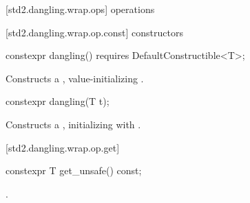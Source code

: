 [std2.dangling.wrap.ops]{ operations}

[std2.dangling.wrap.op.const]{ constructors}

%
\begin{itemdecl}
constexpr dangling() requires DefaultConstructible<T>;
\end{itemdecl}

\begin{itemdescr}
\pnum
\effects Constructs a , value-initializing .
\end{itemdescr}

%
\begin{itemdecl}
constexpr dangling(T t);
\end{itemdecl}

\begin{itemdescr}
\pnum
\effects Constructs a , initializing  with .
\end{itemdescr}

[std2.dangling.wrap.op.get]{}

%
%
\begin{itemdecl}
constexpr T get_unsafe() const;
\end{itemdecl}

\begin{itemdescr}
\pnum
\returns {}.
\end{itemdescr}

\setcounter{SectionDepthBase}{0}
